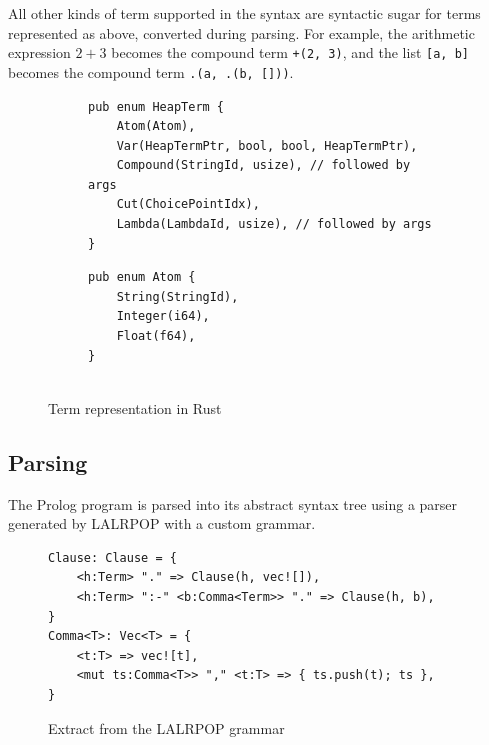 \vspace*{-1.5em}

All other kinds of term supported in the syntax are syntactic sugar for terms represented as above, converted during parsing. For example, the arithmetic expression $2 + 3$ becomes the compound term \texttt{+(2, 3)}, and the list \texttt{[a, b]} becomes the compound term \texttt{.(a, .(b, []))}.

\begin{figure}[H]
\centering
\begin{subfigure}{0.7\textwidth}
\centering
\begin{verbatim}
pub enum HeapTerm {
    Atom(Atom),
    Var(HeapTermPtr, bool, bool, HeapTermPtr),
    Compound(StringId, usize), // followed by args
    Cut(ChoicePointIdx),
    Lambda(LambdaId, usize), // followed by args
}
\end{verbatim}
\end{subfigure}%
\begin{subfigure}{0.3\textwidth}
\centering
\begin{verbatim}
pub enum Atom {
    String(StringId),
    Integer(i64),
    Float(f64),
}


\end{verbatim}
\end{subfigure}
\caption{Term representation in Rust}
\label{fig:rust-term-representation}
\end{figure}

\subsection{Parsing}

The Prolog program is parsed into its abstract syntax tree using a parser generated by LALRPOP \cite{thelalrpopprojectdevelopersLALRPOPhttpsgithubcom2015} with a custom grammar.

\begin{figure}[H]
\centering
\begin{verbatim}
Clause: Clause = {
    <h:Term> "." => Clause(h, vec![]),
    <h:Term> ":-" <b:Comma<Term>> "." => Clause(h, b),
}
Comma<T>: Vec<T> = {
    <t:T> => vec![t],
    <mut ts:Comma<T>> "," <t:T> => { ts.push(t); ts },
}
\end{verbatim}
\caption{Extract from the LALRPOP grammar}
\label{fig:grammar}
\end{figure}

\vspace*{-1.5em}


